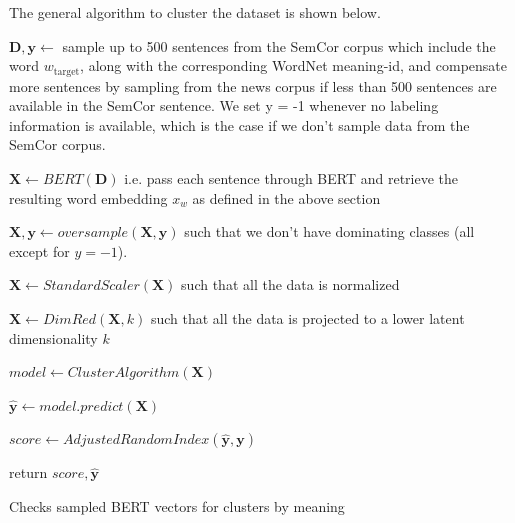 \documentclass[a4paper,12pt,twoside,openright]{report}
\begin{document}
The general algorithm to cluster the dataset is shown below.



\begin{algorithm}[H]
\SetAlgoLined
{}

 $\mathbf{D}, \mathbf{y} \leftarrow $  sample up to 500 sentences from the SemCor corpus which include the word $w_{\text{target}}$, along with the corresponding WordNet meaning-id, and compensate more sentences by sampling from the news corpus if less than 500 sentences are available in the SemCor sentence.
We set y = -1 whenever no labeling information is available, which is the case if we don't sample data from the SemCor corpus.\;

$ \mathbf{X} \leftarrow BERT( \mathbf{D} )$ i.e. pass each sentence through BERT and retrieve the resulting word embedding $x_w$ as defined in the above section\;
 
$ \mathbf{X}, \mathbf{y} \leftarrow oversample( \mathbf{X}, \mathbf{y} )$ such that we don't have dominating classes (all except for $y = -1$).\;
 
$ \mathbf{X} \leftarrow StandardScaler( \mathbf{X})$ such that all the data is normalized\;

$ \mathbf{X} \leftarrow DimRed( \mathbf{X}, k )$ such that all the data is projected to a lower latent dimensionality $k$\;

$ model \leftarrow ClusterAlgorithm( \mathbf{X})$ \;

$ \mathbf{\hat{y}} \leftarrow model.predict(\mathbf{X}) $ \;

$ score \leftarrow AdjustedRandomIndex(\mathbf{\hat{y}}, \mathbf{y}) $ \;

return $ score, \mathbf{\hat{y}}$\;
    
 \caption{Checks sampled BERT vectors for clusters by  meaning}
\end{algorithm}
\end{document}
